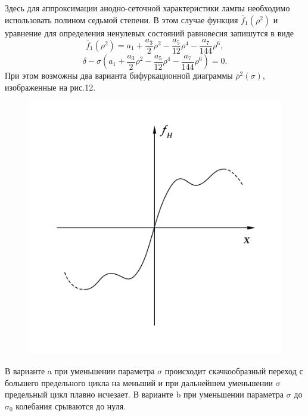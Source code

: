 Здесь для аппроксимации анодно-сеточной характеристики лампы необходимо использовать полином седьмой степени. 
В этом случае функция $\bar{f}_1(\rho^2)$ и уравнение для определения ненулевых состояний равновесия запишутся 
в виде $$\bar{f}_1(\rho^2)=a_1+\frac{a_3}{2}\rho^2-\frac{a_5}{12}\rho^4-\frac{a_7}{144}\rho^6,$$ $$\delta-\sigma(a_1+\frac{a_3}{2}\rho^2-\frac{a_5}{12}\rho^4-\frac{a_7}{144}\rho^6)=0.$$
При этом возможны два варианта бифуркационной диаграммы $\bar \rho^2(\sigma)$, изображенные на рис.12. 
\begin{figure}
    \begin{center}
        \vspace{-30pt}
        \includegraphics[width=\linewidth]{pics/Ris11.png} 
        \vspace{-50pt}
        \label{fig:9}
        \vspace{0pt}
    \end{center}
\end{figure} 

В варианте a при уменьшении параметра $\sigma$ происходит скачкообразный переход с большего предельного цикла на меньший
 и при дальнейшем уменьшении $\sigma$ предельный цикл плавно исчезает. В варианте b при уменьшении параметра $\sigma$ до $\sigma_0$ колебания срываются до нуля. 

